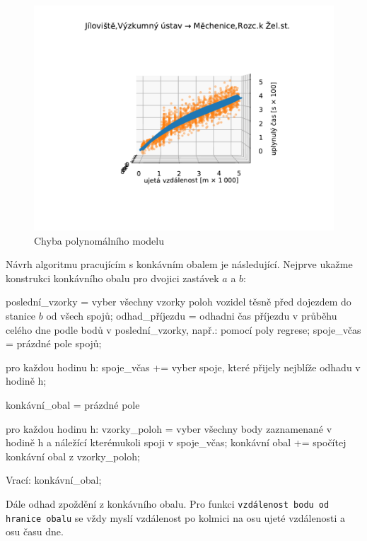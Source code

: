 \begin{figure}
\centering
  \includegraphics[width=\linewidth]{../img/8_9}
  \caption{Chyba polynomálního modelu}
  \label{fig:good_to_concave_hull}
\end{figure}


\bigbreak


Návrh algoritmu pracujícím s konkávním obalem je následující. Nejprve ukažme konstrukci konkávního obalu pro dvojici zastávek $a$ a $b$:


\begin{code}[frame=none]
poslední_vzorky = vyber všechny vzorky poloh vozidel
  těsně před dojezdem do stanice $b$ od všech spojů;
odhad_příjezdu = odhadni čas příjezdu v průběhu celého
  dne podle bodů v poslední_vzorky, např.: pomocí poly regrese;
spoje_včas = prázdné pole spojů;


pro každou hodinu h:
  spoje_včas += vyber spoje, které přijely nejblíže
    odhadu v hodině h;


konkávní_obal = prázdné pole


pro každou hodinu h:
  vzorky_poloh = vyber všechny body zaznamenané
    v hodině h a náležící kterémukoli spoji v spoje_včas;
  konkávní obal += spočítej konkávní obal z vzorky_poloh;


Vrací: konkávní_obal;
\end{code}


Dále odhad zpoždění z konkávního obalu. Pro funkci \verb-vzdálenost bodu od hranice obalu- se vždy myslí vzdálenost po kolmici na osu ujeté vzdálenosti a osu času dne.


